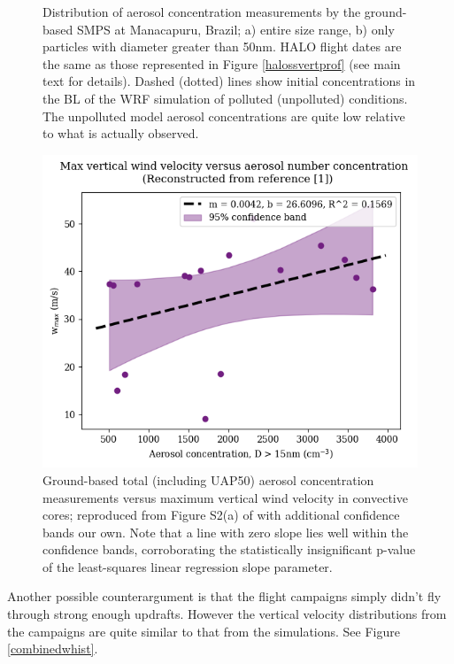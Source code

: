 \documentclass{article}
\begin{document}
\begin{figure}[ht]
\begin{subfigure}{0.7\textwidth}
		\label{goamazonuap50hist}
		\caption{}
	\end{subfigure}
	\caption{Distribution of aerosol concentration measurements by the ground-based SMPS at Manacapuru, Brazil; a) entire size range, b) only particles with diameter greater than 50nm. HALO flight dates are the same as those represented in Figure \ref{halossvertprof} (see main text for details). Dashed (dotted) lines show initial concentrations in the BL of the WRF simulation of polluted (unpolluted) conditions. The unpolluted model aerosol concentrations are quite low relative to what is actually observed.}
	\label{goamazonhist}
\end{figure}
\begin{figure}[ht]
    \centering
    \includegraphics[width=12cm]{halo/fan_fig_s2a.png}
    \caption{Ground-based total (including UAP50) aerosol concentration measurements versus maximum vertical wind velocity in convective cores; reproduced from Figure S2(a) of \cite{Fan2018} with additional confidence bands our own. Note that a line with zero slope lies well within the confidence bands, corroborating the statistically insignificant p-value of the least-squares linear regression slope parameter.}
    \label{fans2a}
\end{figure}

Another possible counterargument is that the flight campaigns simply didn't fly through strong enough updrafts. However the vertical velocity distributions from the campaigns are quite similar to that from the simulations. See Figure \ref{combinedwhist}. 
\end{document}
